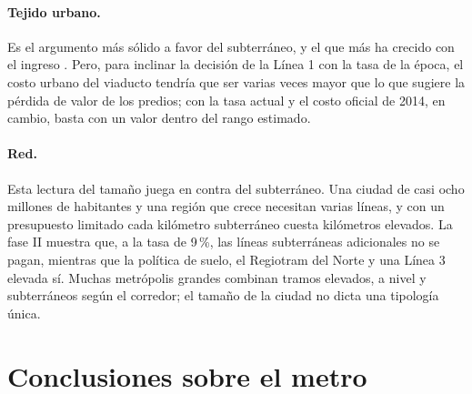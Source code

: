 \paragraph{Tejido urbano.} Es el argumento más sólido a favor del subterráneo, y el que más ha crecido
con el ingreso \citep{ahlfeldt2019}. Pero, para inclinar la decisión de la Línea 1 con la tasa de la
época, el costo urbano del viaducto tendría que ser varias veces mayor que lo que sugiere la pérdida de
valor de los predios; con la tasa actual y el costo oficial de 2014, en cambio, basta con un valor
dentro del rango estimado.

\paragraph{Red.} Esta lectura del tamaño juega en contra del subterráneo. Una ciudad de casi ocho
millones de habitantes y una región que crece necesitan varias líneas, y con un presupuesto limitado
cada kilómetro subterráneo cuesta \KmPorKm{} kilómetros elevados. La fase II muestra que, a la tasa de
9\,\%, las líneas subterráneas adicionales no se pagan, mientras que la política de suelo, el Regiotram
del Norte y una Línea 3 elevada sí. Muchas metrópolis grandes combinan tramos elevados, a nivel y
subterráneos según el corredor; el tamaño de la ciudad no dicta una tipología única.

\section{Conclusiones sobre el metro}\label{sec:conclusiones_metro}


